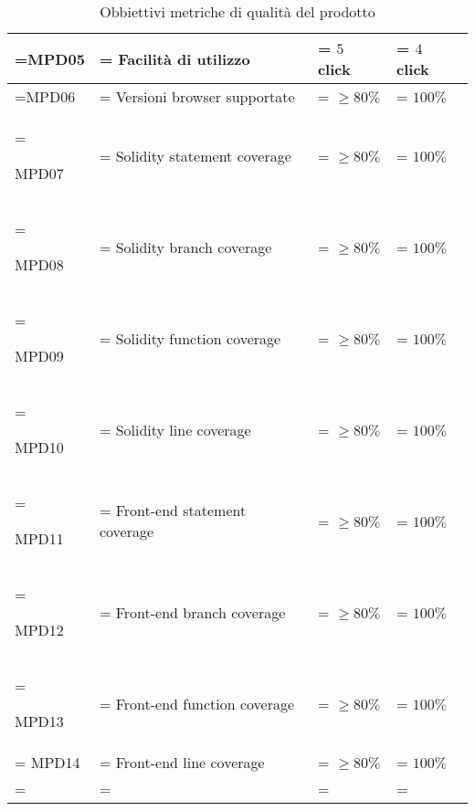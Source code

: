 \begin{xltabular}{\textwidth} {
        >{\hsize\linewidth=\hsize}X
        >{\hsize\linewidth=\hsize}X
        >{\hsize\linewidth=\hsize}X
        >{\hsize\linewidth=\hsize}X
    }
    MPD05 &
    Facilità di utilizzo  &
    $ 5$ click &
    $ 4$ click
    \\ \hline

    MPD06 &
    Versioni browser supportate  &
    $ \geq80\%$&
    $ 100\%$
    \\ \hline

    MPD07 &
    Solidity statement coverage   &
    $ \geq80\%$&
    $ 100\%$
    \\ \hline

    MPD08 &
    Solidity branch coverage  &
    $ \geq80\%$&
    $ 100\%$
    \\ \hline
    
    MPD09 &
    Solidity function coverage   &
    $ \geq80\%$&
    $ 100\%$
    \\ \hline
    
    MPD10 &
    Solidity line coverage   &
    $ \geq80\%$&
    $ 100\%$
    \\ \hline
    
    MPD11 &
    Front-end statement coverage   &
    $ \geq80\%$&
    $ 100\%$
    \\ \hline

    MPD12 &
    Front-end branch coverage   &
    $ \geq80\%$&
    $ 100\%$
    \\ \hline

    MPD13 &
    Front-end function coverage   &
    $ \geq80\%$&
    $ 100\%$
    \\ \hline
    MPD14 &
    Front-end line coverage   &
    $ \geq80\%$&
    $ 100\%$
    \\ \hline

    \caption{Obbiettivi metriche di qualità del prodotto}
\end{xltabular}

